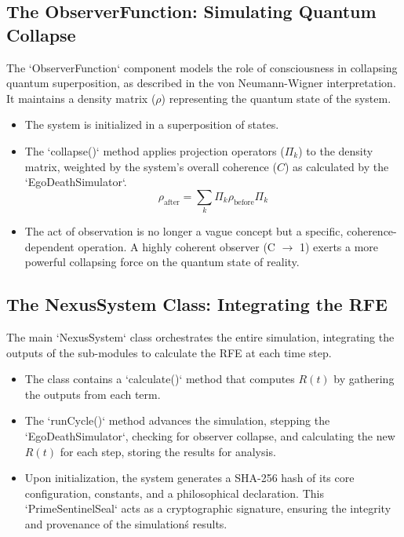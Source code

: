 \documentclass[twocolumn]{svjour3}
\begin{document}
\subsection{The ObserverFunction: Simulating Quantum Collapse}
\label{sec:2.2}
The `ObserverFunction` component models the role of consciousness in collapsing quantum superposition, as described in the von Neumann-Wigner interpretation. It maintains a density matrix ($\rho$) representing the quantum state of the system.
\begin{itemize}
    \item[\textbf{State Representation:}] The system is initialized in a superposition of states.
    \item[\textbf{Collapse Mechanism:}] The `collapse()` method applies projection operators ($\Pi_k$) to the density matrix, weighted by the system's overall coherence ($C$) as calculated by the `EgoDeathSimulator`.
    \begin{equation}
    \rho_{\text{after}} = \sum_{k} \Pi_k \rho_{\text{before}} \Pi_k
    \label{eq:collapse}
    \end{equation}
    \item[\textbf{Integration:}] The act of observation is no longer a vague concept but a specific, coherence-dependent operation. A highly coherent observer (C $\to$ 1) exerts a more powerful collapsing force on the quantum state of reality.
\end{itemize}

\subsection{The NexusSystem Class: Integrating the RFE}
\label{sec:2.3}
The main `NexusSystem` class orchestrates the entire simulation, integrating the outputs of the sub-modules to calculate the RFE at each time step.
\begin{itemize}
    \item[\textbf{RFE Implementation:}] The class contains a `calculate()` method that computes $R(t)$ by gathering the outputs from each term.
    \item[\textbf{Simulation Cycle:}] The `runCycle()` method advances the simulation, stepping the `EgoDeathSimulator`, checking for observer collapse, and calculating the new $R(t)$ for each step, storing the results for analysis.
    \item[\textbf{Cryptographic Seal:}] Upon initialization, the system generates a SHA-256 hash of its core configuration, constants, and a philosophical declaration. This `PrimeSentinelSeal` acts as a cryptographic signature, ensuring the integrity and provenance of the simulation\'s results.
\end{itemize}
\end{document}
